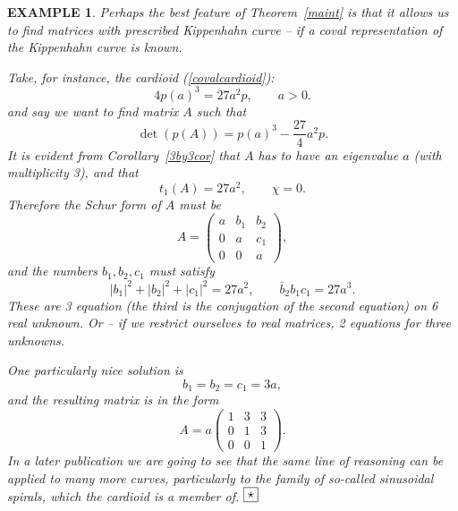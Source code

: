 \documentclass[10pt,a4paper,reqno]{amsart}
\newtheorem{exa}[defi]{\bf E\scriptsize XAMPLE \normalsize}
\def\kopr{\hfill\raisebox{3pt}{\framebox{$\star$}}}
\newenvironment{example}{\begin{exa}\rm}{$\kopr$\end{exa}}
\newcommand{\zav}[1]{\left( #1 \right)}
\newcommand{\deter}[1]{\det\zav{#1}}
\begin{document}
\begin{example}
Perhaps the best feature of Theorem~\ref{maint} is that it allows us to find matrices with prescribed Kippenhahn curve -- \textit{if} a coval representation of the Kippenhahn curve is known.

Take, for instance, the cardioid (\ref{covalcardioid}):
$$
4p(a)^3=27a^2p,\qquad a>0.
$$
and say we want to find matrix $A$ such that
$$
\deter{p(A)}=p(a)^3-\frac{27}{4}a^2 p.
$$
It is evident from Corollary~\ref{3by3cor} that $A$ has to have an eigenvalue $a$ (with multiplicity 3), and that
$$
t_1(A)=27a^2,\qquad \chi=0.
$$
Therefore the Schur form of $A$ must be
$$
A=\zav{\begin{array}{ccc}
a & b_1 & b_2 \\
0 & a & c_1 \\
0 & 0 & a 
\end{array}
},
$$
and the numbers $b_1,b_2,c_1$ must satisfy
$$
|b_1|^2+|b_2|^2+|c_1|^2=27a^2,\qquad \bar b_2b_1c_1=27a^3.
$$
 These are 3 equation (the third is the conjugation of the second equation) on 6 real unknown. Or -- if we restrict ourselves to real matrices, 2 equations for three unknowns.

One particularly nice solution is 
$$
b_1=b_2=c_1=3a,
$$
and the resulting matrix is in the form
$$
A=a\zav{\begin{array}{ccc}
1 & 3 & 3 \\
0 & 1 & 3 \\
0 & 0 & 1 
\end{array}
}.
$$
In a later publication we are going to see that the same line of reasoning can be applied to many more curves, particularly to the family of so-called \textit{sinusoidal spirals}, which the cardioid is a member of.
\end{example}
\end{document}
